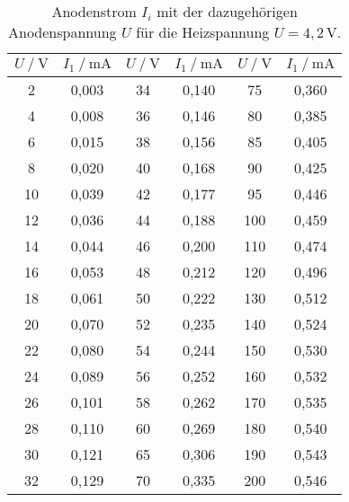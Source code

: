\begin{table}[H]
    \centering
    \caption{Anodenstrom $I_i$ mit der dazugehörigen Anodenspannung $U$ für die Heizspannung $U = 4,2 \, \unit{\volt} $.}
    \label{tab:kennlini1_4}
    \begin{tabular}{S S S S S[table-format=3.1] S}
      \toprule
      {$U \mathbin{/} \unit{\volt}$} & {$I_1 \mathbin{/} \unit{\milli\ampere}$} & {$U \mathbin{/} \unit{\volt}$} & {$I_1 \mathbin{/} \unit{\milli\ampere}$} & {$U \mathbin{/} \unit{\volt}$} & {$I_1 \mathbin{/} \unit{\milli\ampere}$}  \\
      \midrule
        {2}  &     {0,003}       & {34}  &    {0,140} & {75 }    & {0,360} \\
        {4}  &     {0,008}       & {36}  &    {0,146} & {80 }    & {0,385} \\
        {6}  &     {0,015}       & {38}  &    {0,156} & {85 }    & {0,405} \\
        {8}  &     {0,020}       & {40}  &    {0,168} & {90 }    & {0,425} \\
        {10}  &    {0,039}       & {42}  &    {0,177} & {95 }    & {0,446} \\
        {12}  &    {0,036}       & {44}  &    {0,188} & {100}    & {0,459} \\
        {14}  &    {0,044}       & {46}  &    {0,200} & {110}    & {0,474} \\
        {16}  &    {0,053}       & {48}  &    {0,212} & {120}    & {0,496} \\
        {18}  &    {0,061}       & {50}  &    {0,222} & {130}    & {0,512} \\
        {20}  &    {0,070}       & {52}  &    {0,235} & {140}    & {0,524} \\
        {22}  &    {0,080}       & {54}  &    {0,244} & {150}    & {0,530} \\
        {24}  &    {0,089}       & {56}  &    {0,252} & {160}    & {0,532} \\
        {26}  &    {0,101}       & {58}  &    {0,262} & {170}    & {0,535} \\
        {28}  &    {0,110}       & {60}  &    {0,269} & {180}    & {0,540} \\
        {30}  &    {0,121}       & {65}  &    {0,306} & {190}    & {0,543} \\
        {32}  &    {0,129}       & {70}  &    {0,335} & {200}    & {0,546} \\
      \bottomrule
    \end{tabular}
\end{table}

